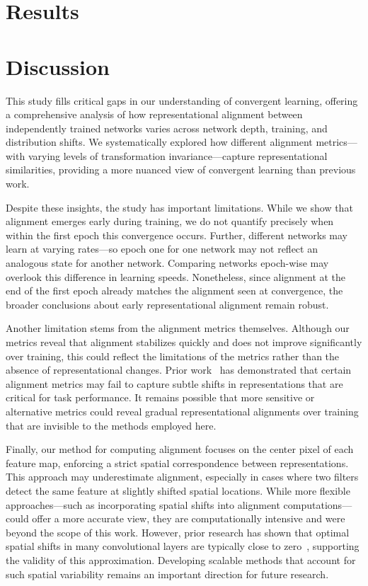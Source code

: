 \documentclass[10pt,letterpaper]{article}
\begin{document}
\section{Results}











\section{Discussion}
This study fills critical gaps in our understanding of convergent learning, offering a comprehensive analysis of how representational alignment between independently trained networks varies across network depth, training, and distribution shifts. We systematically explored how different alignment metrics—with varying levels of transformation invariance---capture representational similarities, providing a more nuanced view of convergent learning than previous work.

Despite these insights, the study has important limitations. While we show that alignment emerges early during training, we do not quantify precisely when within the first epoch this convergence occurs. Further, different networks may learn at varying rates---so epoch one for one network may not reflect an analogous state for another network. Comparing networks epoch-wise may overlook this difference in learning speeds. Nonetheless, since alignment at the end of the first epoch already matches the alignment seen at convergence, the broader conclusions about early representational alignment remain robust.

Another limitation stems from the alignment metrics themselves. Although our metrics reveal that alignment stabilizes quickly and does not improve significantly over training, this could reflect the limitations of the metrics rather than the absence of representational changes. Prior work~\citep{bo2024evaluating} has demonstrated that certain alignment metrics may fail to capture subtle shifts in representations that are critical for task performance. It remains possible that more sensitive or alternative metrics could reveal gradual representational alignments over training that are invisible to the methods employed here.

Finally, our method for computing alignment focuses on the center pixel of each feature map, enforcing a strict spatial correspondence between representations.  This approach may underestimate alignment, especially in cases where two filters detect the same feature at slightly shifted spatial locations. While more flexible approaches---such as incorporating spatial shifts into alignment computations---could offer a more accurate view, they are computationally intensive and were beyond the scope of this work. However, prior research has shown that optimal spatial shifts in many convolutional layers are typically close to zero~\citep{williams2021generalized}, supporting the validity of this approximation. Developing scalable methods that account for such spatial variability remains an important direction for future research.
\end{document}
